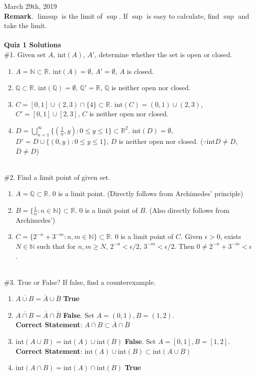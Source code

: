 \documentclass[12pt]{report}
\newcommand{\bb}[1]{\mathbb{#1}}
\newcommand{\inte}{\mathrm{int}}
\begin{document}
March 29th, 2019\\
\textbf{Remark}. $\limsup$ is the limit of $\sup$. If $\sup$ is easy to calculate, find $\sup$ and take the limit.\\\\
\textbf{Quiz 1 Solutions}\\
\#1. Given set $A$, $\inte(A)$, $A'$, determine whether the set is open or closed.
\begin{enumerate}
	\item $A = \bb{N}\subset \bb{R}$. $\inte(A) = \emptyset$, $A' = \emptyset$, $A$ is closed.
	\item $\bb{Q} \subset \bb{R}$. $\inte(\bb{Q}) = \emptyset$, $\bb{Q}' = \bb{R}$, $\bb{Q}$ is neither open nor closed.
	\item $C = [0, 1]\cup (2, 3)\cap \{4\}\subset \bb{R}$. $\inte(C) = (0, 1)\cup (2, 3)$, $C' = [0, 1]\cup [2, 3]$, $C$ is neither open nor closed.
	\item $D = \bigcup_{n=1}^\infty \{(\frac{1}{n}, y) : 0\leq y\leq 1 \}\subset \bb{R}^2$. $\inte(D) = \emptyset$, $D'=D\cup \{(0, y) :0\leq y\leq 1 \}$, $D$ is neither open nor closed. ($\because \inte D \neq D$, $\overline{D}\neq D$)
\end{enumerate}~\\
\#2. Find a limit point of given set.
\begin{enumerate}
	\item $A = \bb{Q}\subset\bb{R}$. $0$ is a limit point. (Directly follows from Archimedes' principle)
	\item $B = \{\frac{1}{n}: n\in \bb{N} \}\subset\bb{R}$. $0$ is a limit point of $B$. (Also directly follows from Archimedes')
	\item $C = \{2^{-n} + 3^{-m}: n, m\in \bb{N} \} \subset \bb{R}$. $0$ is a limit point of $C$. Given $\epsilon > 0$, exists $N\in \bb{N}$ such that for $n, m\geq N$, $2^{-n} < \epsilon/2$, $3^{-m} < \epsilon / 2$. Then $0\neq 2^{-n} + 3^{-m} < \epsilon$.
\end{enumerate}~\\
\#3. True or False? If false, find a counterexample.
\begin{enumerate}
	\item $\overline{A\cup B} = \overline{A} \cup \overline{B}$ \textbf{True}
	\item $ \overline{A\cap B} = \overline{A} \cap \overline{B} $ \textbf{False}. Set $A = (0, 1), B = (1, 2)$. \\\textbf{Correct Statement}: $ \overline{A\cap B} \subset \overline{A} \cap \overline{B}$
	\item $ \inte(A\cup B) = \inte(A) \cup \inte(B) $ \textbf{False}. Set $A = [0, 1], B = [1, 2]$. \\\textbf{Correct Statement}: $\inte(A) \cup \inte(B) \subset \inte(A\cup B)$
	\item $ \inte(A\cap B) = \inte(A) \cap \inte(B) $ \textbf{True}
\end{enumerate}
\end{document}
